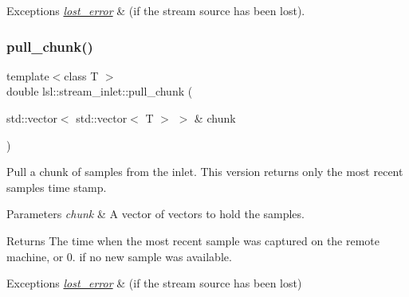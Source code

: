 \begin{DoxyExceptions}{Exceptions}
{\em \hyperlink{classlsl_1_1lost__error}{lost\+\_\+error}} & (if the stream source has been lost). \\
\hline
\end{DoxyExceptions}
\mbox{\label{classlsl_1_1stream__inlet_acf6cdc3afdbb4c31c97fb979e4aca632}} 
\subsubsection{\texorpdfstring{pull\+\_\+chunk()}{pull\_chunk()}\hspace{0.1cm}{\footnotesize\ttfamily [2/3]}}
{\footnotesize\ttfamily template$<$class T $>$ \\
double lsl\+::stream\+\_\+inlet\+::pull\+\_\+chunk (\begin{DoxyParamCaption}\item[{std\+::vector$<$ std\+::vector$<$ T $>$ $>$ \&}]{chunk }\end{DoxyParamCaption})\hspace{0.3cm}{\ttfamily [inline]}}

Pull a chunk of samples from the inlet. This version returns only the most recent sample\textquotesingle{}s time stamp. 
\begin{DoxyParams}{Parameters}
{\em chunk} & A vector of vectors to hold the samples. \\
\hline
\end{DoxyParams}
\begin{DoxyReturn}{Returns}
The time when the most recent sample was captured on the remote machine, or 0. if no new sample was available. 
\end{DoxyReturn}

\begin{DoxyExceptions}{Exceptions}
{\em \hyperlink{classlsl_1_1lost__error}{lost\+\_\+error}} & (if the stream source has been lost) \\
\hline
\end{DoxyExceptions}
\mbox{\label{classlsl_1_1stream__inlet_a558f53812f5dc3c19b2cbe0026a61f6a}} 

